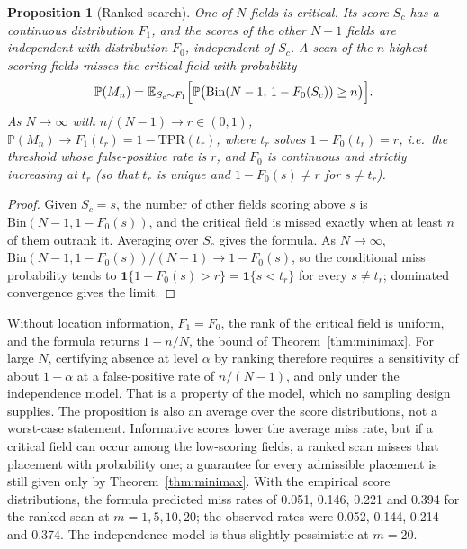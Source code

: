 \documentclass[11pt]{article}
\newtheorem{proposition}{Proposition}
\theoremstyle{remark}
\theoremstyle{definition}
\newcommand{\Prb}{\mathbb{P}}
\newcommand{\E}{\mathbb{E}}
\begin{document}
\begin{proposition}[Ranked search]\label{prop:bridge}
One of $N$ fields is critical. Its score $S_c$ has a continuous distribution $F_1$, and the scores of the other $N-1$ fields are independent with distribution $F_0$, independent of $S_c$. A scan of the $n$ highest-scoring fields misses the critical field with probability
\[
\Prb(M_n)=\E_{S_c\sim F_1}\Bigl[\Prb\bigl(\mathrm{Bin}(N-1,\,1-F_0(S_c))\ge n\bigr)\Bigr].
\]
As $N\to\infty$ with $n/(N-1)\to r\in(0,1)$, $\Prb(M_n)\to F_1(t_r)=1-\mathrm{TPR}(t_r)$, where $t_r$ solves $1-F_0(t_r)=r$, i.e.\ the threshold whose false-positive rate is $r$, and $F_0$ is continuous and strictly increasing at $t_r$ (so that $t_r$ is unique and $1-F_0(s)\ne r$ for $s\ne t_r$).
\end{proposition}
\begin{proof}
Given $S_c=s$, the number of other fields scoring above $s$ is $\mathrm{Bin}(N-1,1-F_0(s))$, and the critical field is missed exactly when at least $n$ of them outrank it. Averaging over $S_c$ gives the formula. As $N\to\infty$, $\mathrm{Bin}(N-1,1-F_0(s))/(N-1)\to1-F_0(s)$, so the conditional miss probability tends to $\mathbf 1\{1-F_0(s)>r\}=\mathbf 1\{s<t_r\}$ for every $s\ne t_r$; dominated convergence gives the limit.
\end{proof}
Without location information, $F_1=F_0$, the rank of the critical field is uniform, and the formula returns $1-n/N$, the bound of Theorem~\ref{thm:minimax}. For large $N$, certifying absence at level $\alpha$ by ranking therefore requires a sensitivity of about $1-\alpha$ at a false-positive rate of $n/(N-1)$, and only under the independence model. That is a property of the model, which no sampling design supplies. The proposition is also an average over the score distributions, not a worst-case statement. Informative scores lower the average miss rate, but if a critical field can occur among the low-scoring fields, a ranked scan misses that placement with probability one; a guarantee for every admissible placement is still given only by Theorem~\ref{thm:minimax}. With the empirical score distributions, the formula predicted miss rates of 0.051, 0.146, 0.221 and 0.394 for the ranked scan at $m=1,5,10,20$; the observed rates were 0.052, 0.144, 0.214 and 0.374. The independence model is thus slightly pessimistic at $m=20$.
\end{document}
